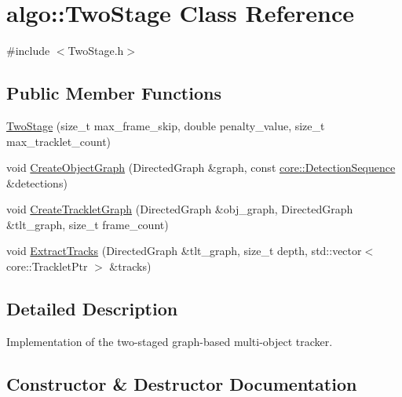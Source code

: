 \hypertarget{classalgo_1_1TwoStage}{}\section{algo\+:\+:Two\+Stage Class Reference}
\label{classalgo_1_1TwoStage}


{\ttfamily \#include $<$Two\+Stage.\+h$>$}

\subsection*{Public Member Functions}
\begin{DoxyCompactItemize}
\item 
\hyperlink{classalgo_1_1TwoStage_ae302f9ea93d56155a9dbd0be060500f7}{Two\+Stage} (size\+\_\+t max\+\_\+frame\+\_\+skip, double penalty\+\_\+value, size\+\_\+t max\+\_\+tracklet\+\_\+count)
\item 
void \hyperlink{classalgo_1_1TwoStage_a02dfe4e3fb244ecad13f676ce53d689a}{Create\+Object\+Graph} (Directed\+Graph \&graph, const \hyperlink{classcore_1_1DetectionSequence}{core\+::\+Detection\+Sequence} \&detections)
\item 
void \hyperlink{classalgo_1_1TwoStage_ae14cf79859b4275c862d6750b6bc6837}{Create\+Tracklet\+Graph} (Directed\+Graph \&obj\+\_\+graph, Directed\+Graph \&tlt\+\_\+graph, size\+\_\+t frame\+\_\+count)
\item 
void \hyperlink{classalgo_1_1TwoStage_a09168d0ace15d689c9d594ca16b93c38}{Extract\+Tracks} (Directed\+Graph \&tlt\+\_\+graph, size\+\_\+t depth, std\+::vector$<$ core\+::\+Tracklet\+Ptr $>$ \&tracks)
\end{DoxyCompactItemize}


\subsection{Detailed Description}
Implementation of the two-\/staged graph-\/based multi-\/object tracker. 

\subsection{Constructor \& Destructor Documentation}
